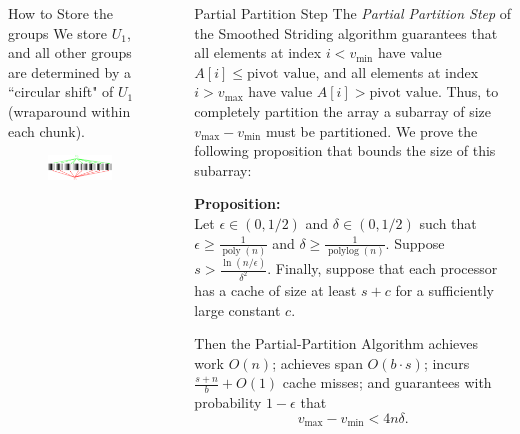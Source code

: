 \documentclass[table,serif,mathserif,final]{beamer}
\newcommand{\polylog}{\operatorname{polylog}}
\newcommand{\poly}{\operatorname{poly}}
\theoremstyle{remark}
\begin{document}
\begin{frame}{}
\begin{columns}[t]
\begin{column}{0.295\linewidth}
\begin{block}{\Huge How to Store the groups}
	\vspace{0.5cm}
	We store $U_1$, and all other groups are determined by a ``circular shift" of $U_1$ (wraparound within each chunk).
	\vspace{0.5cm}
	\begin{figure}
		\includegraphics[width=\linewidth]{imgs/blackrainbowAlt.eps}
	\end{figure}	
\end{block}
\end{column}

\begin{column}{0.02\linewidth}
\end{column}

\begin{column}{0.21\linewidth}

  \begin{block}{\Huge Partial Partition Step}
    \Huge
    The \emph{Partial Partition Step} of the Smoothed Striding algorithm guarantees that all elements at index $ i < v_{\min}$ have value $A[i] \le \text{pivot value}$, and all elements at index $i > v_{\max}$ have value $A[i] > \text{pivot value}$. Thus, to completely partition the array a subarray of size $v_{\max} - v_{\min}$ must be partitioned. We prove the following proposition that bounds the size of this subarray:
    
  \textbf{Proposition:\\}
  Let $\epsilon \in (0, 1/2)$ and $\delta \in (0, 1/2)$ such that
  $\epsilon \ge \frac{1}{\poly(n)}$ and $\delta \ge
  \frac{1}{\polylog(n)}$. Suppose $s > \frac{\ln
    (n/\epsilon)}{\delta^2}$. Finally, suppose that each processor has
  a cache of size at least $s + c$ for a sufficiently large constant
  $c$.

  Then the Partial-Partition Algorithm achieves work $O(n)$; achieves
  span $O\left(b \cdot s\right)$; incurs $\frac{s+n}{b} + O(1)$ cache
  misses; and guarantees with probability $1 - \epsilon$ that
  $$v_{\text{max}}-v_{\text{min}} < 4 n \delta.$$
  \end{block}


\end{column}
\end{columns}
\end{frame}
\end{document}
